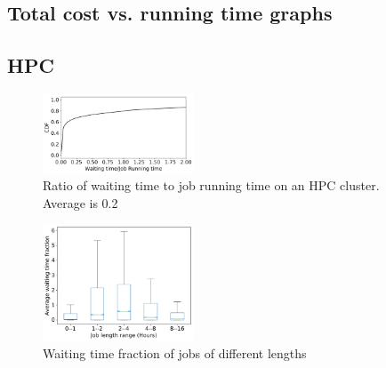 \subsection{Total cost vs. running time graphs}

\subsection{HPC}

\begin{figure}
  \includegraphics[width=0.4\textwidth]{../data/waiting_all.pdf}
  \caption{Ratio of waiting time to job running time on an HPC cluster. Average is 0.2}
  \label{fig:hpc-wait-cdf}
\end{figure}



\begin{figure}
  \includegraphics[width=0.4\textwidth]{../graphs/waiting_time_buckets.pdf}
  \caption{Waiting time fraction of jobs of different lengths}
  \label{fig:hpc-wait-buckets}  
\end{figure}

